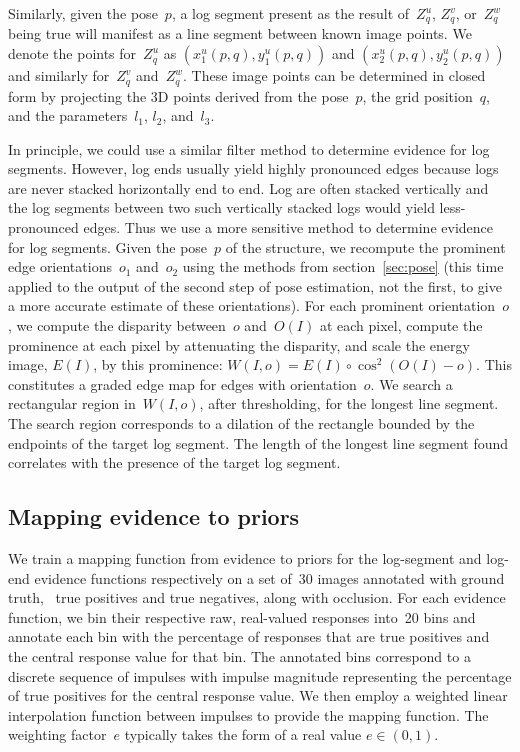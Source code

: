 Similarly, given the pose~$p$, a log segment present as the result of~$Z^u_q$,
$Z^v_q$, or~$Z^w_q$ being true will manifest as a line segment between known
image points.
%
We denote the points for~$Z^u_q$ as $(x^u_1(p,q),y^u_1(p,q))$ and
$(x^u_2(p,q),y^u_2(p,q))$ and similarly for~$Z^v_q$ and~$Z^w_q$.
%
These image points can be determined in closed form by projecting the 3D points
derived from the pose~$p$, the grid position~$q$, and the
parameters~$l_1$, $l_2$, and~$l_3$.

In principle, we could use a similar filter method to determine evidence for
log segments.
%
However, log ends usually yield highly pronounced edges because logs are never
stacked horizontally end to end.
%
Log are often stacked vertically and the log segments between two such
vertically stacked logs would yield less-pronounced edges.
%
Thus we use a more sensitive method to determine evidence for log segments.
%
Given the pose~$p$ of the structure, we recompute the prominent edge
orientations~$o_1$ and~$o_2$ using the methods from section~\ref{sec:pose}
(this time applied to the output of the second step of pose estimation, not the
first, to give a more accurate estimate of these orientations).
%
For each prominent orientation~$o$, we compute the disparity between~$o$
and~$O(I)$ at each pixel, compute the prominence at each pixel by attenuating
the disparity, and scale the energy image, $E(I)$, by this prominence:
%
$W(I,o)=E(I)\circ\cos^2(O(I)-o)$.
%
This constitutes a graded edge map for edges with orientation~$o$.
%
%
We search a rectangular region in~$W(I,o)$, after thresholding, for the longest
line segment.
%
%
The search region corresponds to a dilation of the rectangle bounded by the
endpoints of the target log segment.
%
The length of the longest line segment found correlates with the presence of the
target log segment.

\subsection{Mapping evidence to priors}
\label{sec:mapping}
%
We train a mapping function from evidence to priors for the log-segment and
log-end evidence functions respectively on a set of~30 images annotated with
ground truth, \ie\ true positives and true negatives, along with occlusion.
%
For each evidence function, we bin their respective raw, real-valued responses
into~20 bins and annotate each bin with the percentage of responses that are
true positives and the central response value for that bin.
%
The annotated bins correspond to a discrete sequence of impulses with impulse
magnitude representing the percentage of true positives for the central response
value.
%
We then employ a weighted linear interpolation function between impulses to
provide the mapping function.
%
The weighting factor~$e$ typically takes the form of a real value $e\in(0,1)$.

